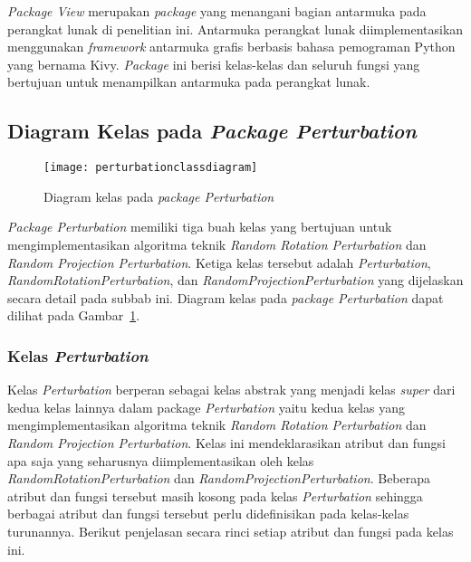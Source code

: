 \textit{Package View} merupakan \textit{package} yang menangani bagian antarmuka pada perangkat lunak di penelitian ini. Antarmuka perangkat lunak diimplementasikan menggunakan \textit{framework} antarmuka grafis berbasis bahasa pemograman Python yang bernama Kivy. \textit{Package} ini berisi kelas-kelas dan seluruh fungsi yang bertujuan untuk menampilkan antarmuka pada perangkat lunak.

\subsection{Diagram Kelas pada \textit{Package Perturbation}}
\label{subsec:diagram-kelas-perturbation}

\begin{figure}
	\centering
	\texttt{[image: perturbationclassdiagram]}
	\caption{Diagram kelas pada \textit{package Perturbation}}
	\label{fig:perturbationclassdiagram}
\end{figure}

\textit{Package Perturbation} memiliki tiga buah kelas yang bertujuan untuk mengimplementasikan algoritma teknik \textit{Random Rotation Perturbation} dan \textit{Random Projection Perturbation}. Ketiga kelas tersebut adalah \textit{Perturbation}, \textit{RandomRotationPerturbation}, dan \textit{RandomProjectionPerturbation} yang dijelaskan secara detail pada subbab ini. Diagram kelas pada \textit{package Perturbation} dapat dilihat pada Gambar~\ref{fig:perturbationclassdiagram}.

\subsubsection{Kelas \textit{Perturbation}}
\label{subsubsec:kelas-perturbation}

Kelas \textit{Perturbation} berperan sebagai kelas abstrak yang menjadi kelas \textit{super} dari kedua kelas lainnya dalam package \textit{Perturbation} yaitu kedua kelas yang mengimplementasikan algoritma teknik \textit{Random Rotation Perturbation} dan \textit{Random Projection Perturbation}. Kelas ini mendeklarasikan atribut dan fungsi apa saja yang seharusnya diimplementasikan oleh kelas \textit{RandomRotationPerturbation} dan \textit{RandomProjectionPerturbation}. Beberapa atribut dan fungsi tersebut masih kosong pada kelas \textit{Perturbation} sehingga berbagai atribut dan fungsi tersebut perlu didefinisikan pada kelas-kelas turunannya. Berikut penjelasan secara rinci setiap atribut dan fungsi pada kelas ini.

